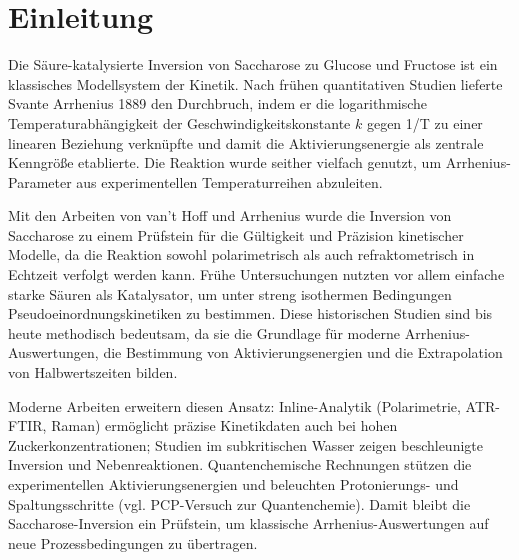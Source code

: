 
\section{Einleitung}
Die Säure-katalysierte Inversion von Saccharose zu Glucose und Fructose ist ein klassisches Modellsystem der Kinetik.
Nach frühen quantitativen Studien\autocite{HarcourtEsson1866connexion} lieferte Svante Arrhenius 1889 den Durchbruch, indem er die logarithmische Temperaturabhängigkeit der Geschwindigkeitskonstante $k$ gegen 1/T zu einer linearen Beziehung verknüpfte und damit die Aktivierungsenergie als zentrale Kenngröße etablierte.
Die Reaktion wurde seither vielfach genutzt, um Arrhenius-Parameter aus experimentellen Temperaturreihen abzuleiten.

Mit den Arbeiten von van't Hoff und Arrhenius wurde die Inversion von Saccharose zu einem Prüfstein für die Gültigkeit und Präzision kinetischer Modelle, da die Reaktion sowohl polarimetrisch als auch refraktometrisch in Echtzeit verfolgt werden kann.
Frühe Untersuchungen nutzten vor allem einfache starke Säuren als Katalysator, um unter streng isothermen Bedingungen Pseudoeinordnungskinetiken zu bestimmen.
Diese historischen Studien sind bis heute methodisch bedeutsam, da sie die Grundlage für moderne Arrhenius-Auswertungen, die Bestimmung von Aktivierungsenergien und die Extrapolation von Halbwertszeiten bilden.

Moderne Arbeiten erweitern diesen Ansatz: Inline-Analytik (Polarimetrie, ATR-FTIR, Raman) ermöglicht präzise Kinetikdaten auch bei hohen Zuckerkonzentrationen;
Studien im subkritischen Wasser zeigen beschleunigte Inversion und Nebenreaktionen.\autocite{Oomori2004-td}
Quantenchemische Rechnungen stützen die experimentellen Aktivierungsenergien und beleuchten Protonierungs- und Spaltungsschritte (vgl. PCP-Versuch zur Quantenchemie).
Damit bleibt die Saccharose-Inversion ein Prüfstein, um klassische Arrhenius-Auswertungen auf neue Prozessbedingungen zu übertragen.

